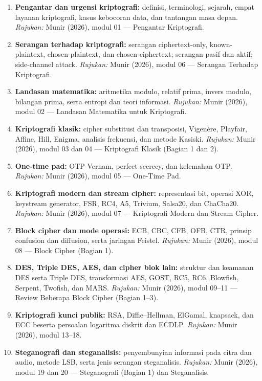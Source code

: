 \documentclass[12pt,a4paper]{article}
\begin{document}
\begin{enumerate}[leftmargin=*]
  \item \textbf{Pengantar dan urgensi kriptografi:} definisi, terminologi, sejarah, empat layanan kriptografi, kasus kebocoran data, dan tantangan masa depan.
    \textit{Rujukan:} Munir (2026), modul 01 --- Pengantar Kriptografi.
  \item \textbf{Serangan terhadap kriptografi:} serangan ciphertext-only, known-plaintext, chosen-plaintext, dan chosen-ciphertext; serangan pasif dan aktif; side-channel attack.
    \textit{Rujukan:} Munir (2026), modul 06 --- Serangan Terhadap Kriptografi.
  \item \textbf{Landasan matematika:} aritmetika modulo, relatif prima, invers modulo, bilangan prima, serta entropi dan teori informasi.
    \textit{Rujukan:} Munir (2026), modul 02 --- Landasan Matematika untuk Kriptografi.
  \item \textbf{Kriptografi klasik:} cipher substitusi dan transposisi, Vigen\`{e}re, Playfair, Affine, Hill, Enigma, analisis frekuensi, dan metode Kasiski.
    \textit{Rujukan:} Munir (2026), modul 03 dan 04 --- Kriptografi Klasik (Bagian 1 dan 2).
  \item \textbf{One-time pad:} OTP Vernam, perfect secrecy, dan kelemahan OTP.
    \textit{Rujukan:} Munir (2026), modul 05 --- One-Time Pad.
  \item \textbf{Kriptografi modern dan stream cipher:} representasi bit, operasi XOR, keystream generator, FSR, RC4, A5, Trivium, Salsa20, dan ChaCha20.
    \textit{Rujukan:} Munir (2026), modul 07 --- Kriptografi Modern dan Stream Cipher.
  \item \textbf{Block cipher dan mode operasi:} ECB, CBC, CFB, OFB, CTR, prinsip confusion dan diffusion, serta jaringan Feistel.
    \textit{Rujukan:} Munir (2026), modul 08 --- Block Cipher (Bagian 1).
  \item \textbf{DES, Triple DES, AES, dan cipher blok lain:} struktur dan keamanan DES serta Triple DES, transformasi AES, GOST, RC5, RC6, Blowfish, Serpent, Twofish, dan MARS.
    \textit{Rujukan:} Munir (2026), modul 09--11 --- Review Beberapa Block Cipher (Bagian 1--3).
  \item \textbf{Kriptografi kunci publik:} RSA, Diffie--Hellman, ElGamal, knapsack, dan ECC beserta persoalan logaritma diskrit dan ECDLP.
    \textit{Rujukan:} Munir (2026), modul 13--18.
  \item \textbf{Steganografi dan steganalisis:} penyembunyian informasi pada citra dan audio, metode LSB, serta jenis serangan steganalisis.
    \textit{Rujukan:} Munir (2026), modul 19 dan 20 --- Steganografi (Bagian 1) dan Steganalisis.
\end{enumerate}
\end{document}
